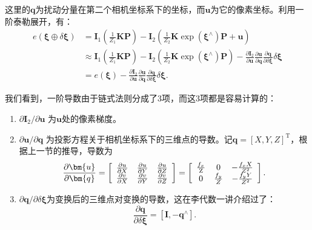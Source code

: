 这里的$\bm{q}$为扰动分量在第二个相机坐标系下的坐标，而$\bm{u}$为它的像素坐标。利用一阶泰勒展开，有：
\begin{align*}
e \left( { \bm{\xi}  \oplus \delta \bm{\xi} } \right) &= {\bm{I}_1}\left( {\frac{1}{{{Z_1}}} \bm{KP}} \right) - {\bm{I}_2}\left( {\frac{1}{{{Z_2}}} \bm{K} \exp \left( {{\bm{\xi} ^ \wedge }} \right) \bm{P} + \bm{u}} \right)\\
& \approx { \bm{I}_1}\left( {\frac{1}{{{Z_1}}} \bm{KP}} \right) - {\bm{I}_2}\left( {\frac{1}{{{Z_2}}} \bm{K}\exp \left( {{\bm{\xi} ^ \wedge }} \right) \bm{P}} \right) - \frac{{\partial { \bm{I}_2}}}{{\partial \bm{u}}}\frac{{\partial \bm{u}}}{{\partial \bm{q}}}\frac{{\partial \bm{q}}}{{\partial \delta \bm{\xi} }}\delta \bm{\xi} \\
&= e\left( \bm{\xi}  \right) - \frac{{\partial {\bm{I}_2}}}{{\partial \bm{u}}}\frac{{\partial \bm{u}}}{{\partial \bm{q}}}\frac{{\partial \bm{q}}}{{\partial \delta \bm{\xi} }}\delta \bm{\xi} .
\end{align*}

\clearpage
我们看到，一阶导数由于链式法则分成了3项，而这3项都是容易计算的：

\begin{enumerate}
	\item $ \partial \bm{I}_2 / \partial \bm{u} $ 为$\bm{u}$处的像素梯度。
	\item $ \partial \bm{u} / \partial \bm{q} $ 为投影方程关于相机坐标系下的三维点的导数。记$\bm{q}=[X,Y,Z]^\mathrm{T}$，根据上一节的推导，导数为
	\begin{equation}
	\frac{{\partial \bm{u}}}{{\partial \bm{q}}} = \left[ {\begin{array}{*{20}{c}}
		{\frac{{\partial u}}{{\partial X}}}&{\frac{{\partial u}}{{\partial Y}}}&{\frac{{\partial u}}{{\partial Z}}}\\
		{\frac{{\partial v}}{{\partial X}}}&{\frac{{\partial v}}{{\partial Y}}}&{\frac{{\partial v}}{{\partial Z}}}
		\end{array}} \right] = \left[ {\begin{array}{*{20}{c}}
		{\frac{{{f_x}}}{{\rm{Z}}}}&0&{ - \frac{{{f_x}X}}{{{Z^2}}}}\\
		0&{\frac{{{f_y}}}{Z}}&{ - \frac{{{f_y}Y}}{{{Z^2}}}}
		\end{array}} \right].
	\end{equation}
	
	\item ${\partial \bm{q}}/{\partial \delta \bm{\xi} }$为变换后的三维点对变换的导数，这在李代数一讲介绍过了：
	\begin{equation}
	\frac{{\partial \bm{q}}}{{\partial \delta \bm{\xi} }} = \left[ { \bm{I}, - {\bm{q}^ \wedge }} \right].
	\end{equation}
\end{enumerate}

